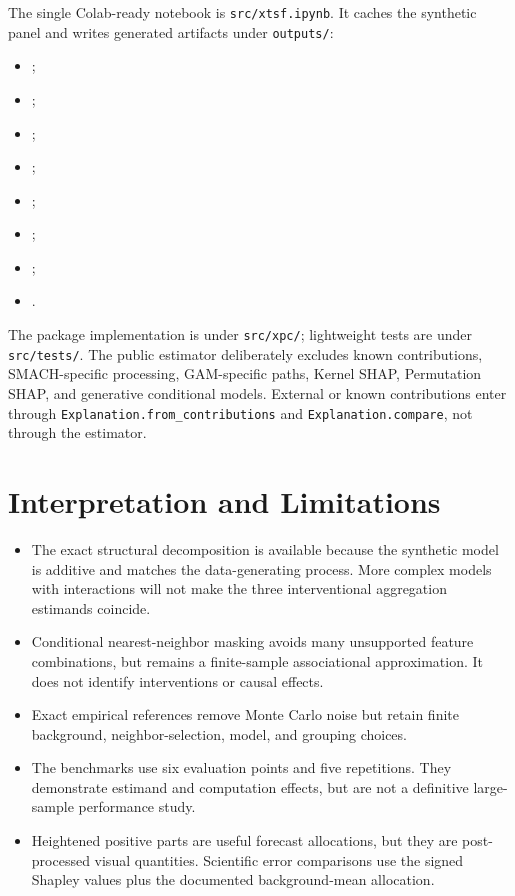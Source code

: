 \documentclass[11pt]{article}
\newcommand{\code}[1]{\texttt{#1}}
\begin{document}
The single Colab-ready notebook is \code{src/xtsf.ipynb}.  It caches the
synthetic panel and writes generated artifacts under \code{outputs/}:

\begin{itemize}
  \item {};
  \item {};
  \item {};
  \item {};
  \item {};
  \item {};
  \item {};
  \item {}.
\end{itemize}

The package implementation is under \code{src/xpc/}; lightweight tests are
under \code{src/tests/}.  The public estimator deliberately excludes known
contributions, SMACH-specific processing, GAM-specific paths, Kernel SHAP,
Permutation SHAP, and generative conditional models.  External or known
contributions enter through \code{Explanation.from\_contributions} and
\code{Explanation.compare}, not through the estimator.

\section{Interpretation and Limitations}

\begin{itemize}
  \item The exact structural decomposition is available because the synthetic
        model is additive and matches the data-generating process.  More complex
        models with interactions will not make the three interventional
        aggregation estimands coincide.
  \item Conditional nearest-neighbor masking avoids many unsupported feature
        combinations, but remains a finite-sample associational approximation.
        It does not identify interventions or causal effects.
  \item Exact empirical references remove Monte Carlo noise but retain finite
        background, neighbor-selection, model, and grouping choices.
  \item The benchmarks use six evaluation points and five repetitions.  They
        demonstrate estimand and computation effects, but are not a definitive
        large-sample performance study.
  \item Heightened positive parts are useful forecast allocations, but they are
        post-processed visual quantities.  Scientific error comparisons use the
        signed Shapley values plus the documented background-mean allocation.
\end{itemize}
\end{document}
